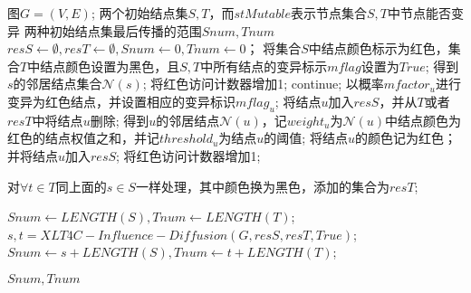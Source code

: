 \begin{algorithm}
	\caption{$XLT4C-Influence-Diffusion(G, S, T, stMutable)$}
	\label{alg:chap4:xlt4c-inf-diffusion}
	\begin{algorithmic}[1]
	\REQUIRE 图$G=(V,E)$; 两个初始结点集$S,T$，而$stMutable$表示节点集合$S,T$中节点能否变异
	\ENSURE 两种初始结点集最后传播的范围$Snum, Tnum$
		\STATE $resS \leftarrow \emptyset, resT \leftarrow \emptyset, Snum \leftarrow 0, Tnum \leftarrow 0$；
			\STATE 将集合$S$中结点颜色标示为红色，集合$T$中结点颜色设置为黑色，且$S,T$中所有结点的变异标示$mflag$设置为$True$;
		\ENDIF
			\STATE 得到$s$的邻居结点集合$\mathcal{N}(s)$;
					\STATE 将红色访问计数器增加1;
					\STATE continue;
					\STATE 以概率$mfactor_{u}$进行变异为红色结点，并设置相应的变异标识$mflag_{u}$;
					\STATE 将结点$u$加入$resS$，并从$T$或者$resT$中将结点$u$删除;
				\ELSE
					\STATE 得到$u$的邻居结点$\mathcal{N}(u)$，记$weight_{u}$为$\mathcal{N}(u)$中结点颜色为红色的结点权值之和，并记$threshold_{u}$为结点$u$的阈值;
						\STATE 将结点$u$的颜色记为红色；并将结点$u$加入$resS$;
					\ENDIF
				\ENDIF
				\STATE 将红色访问计数器增加1;
			\ENDFOR
		\ENDFOR

		\STATE 对$\forall t \in T$同上面的$s \in S$一样处理，其中颜色换为黑色，添加的集合为$resT$;

			\STATE $Snum \leftarrow LENGTH(S), Tnum \leftarrow LENGTH(T)$;
		\ELSE
			\STATE $s, t = XLT4C-Influence-Diffusion(G, resS, resT, True)$;
			\STATE $Snum \leftarrow s + LENGTH(S), Tnum \leftarrow t + LENGTH(T)$;
		\ENDIF

		\RETURN $Snum, Tnum$
	\end{algorithmic}
\end{algorithm}


